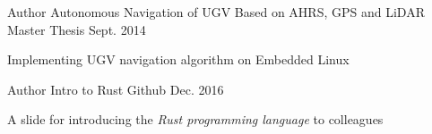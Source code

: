 

\begin{cventries}

  \cventry
    {Author} %
    {Autonomous Navigation of UGV Based on AHRS, GPS and LiDAR} %
    {Master Thesis} %
    {Sept. 2014} %
    {
      \begin{cvitems} %
        \item {Implementing UGV navigation algorithm on Embedded Linux}
      \end{cvitems}
    }

  \cventry
    {Author} %
    {Intro to Rust} %
    {Github} %
    {Dec. 2016} %
    {
      \begin{cvitems} %
          \item {A slide for introducing the \textit{Rust programming language} to colleagues}
      \end{cvitems}
    }

\end{cventries}
